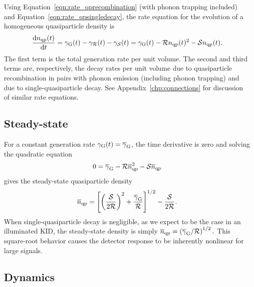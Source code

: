 Using Equation~\ref{eqn:rate_qprecombination} (with phonon trapping included) and Equation~\ref{eqn:rate_qpsingledecay}, the rate equation for the evolution of a homogeneous quasiparticle density is
\begin{equation}
\dv{n_{\mathrm{qp}}(t)}{t}
  =
  \gamma_{\mathrm{G}}(t)
  - \gamma_{\mathcal{R}}(t)
  - \gamma_{\mathcal{S}}(t)
  =
  \gamma_{\mathrm{G}}(t)
  -\mathcal{R} n_{\mathrm{qp}}(t)^2
  -\mathcal{S} n_{\mathrm{qp}}(t).
\label{eqn:rate_qpdensity}
\end{equation}
The first term is the total generation rate per unit volume.
The second and third terms are, respectively, the decay rates per unit volume due to quasiparticle recombination in pairs with phonon emission (including phonon trapping) and due to single-quasiparticle decay.
See Appendix~\ref{chp:connections} for discussion of similar rate equations.


\subsection{Steady-state}
\label{sec:theory.qpnumber.steady-state}

For a constant generation rate
$\gamma_{\mathrm{G}}(t) = \overline{\gamma}_{\mathrm{G}}$,
the time derivative is zero and solving the quadratic equation
\begin{equation}
0
  =
  \overline{\gamma}_{\mathrm{G}}
  - \mathcal{R} \overline{n}_{\mathrm{qp}}^2
  - \mathcal{S} \overline{n}_{\mathrm{qp}}
\label{eqn:ssrate_qpdensity}
\end{equation}
gives the steady-state quasiparticle density
\begin{equation}
\overline{n}_{\mathrm{qp}}
  =
  \left[ \left(\frac{\mathcal{S}}{2 \mathcal{R}}\right)^2
  + \frac{\overline{\gamma}_{\mathrm{G}}}{\mathcal{R}} \right]^{1/2}
  - \frac{\mathcal{S}}{2 \mathcal{R}}.
\label{eqn:ssqpdensity}
\end{equation}
When single-quasiparticle decay is negligible, as we expect to be the case in an illuminated KID, the steady-state density is simply
$
\overline{n}_{\mathrm{qp}}
  =
  \left( \overline{\gamma}_{\mathrm{G}} / \mathcal{R} \right)^{1/2}.
$
This square-root behavior causes the detector response to be inherently nonlinear for large signals.

\subsection{Dynamics}
\label{sec:theory.qpnumber.dynamics}

